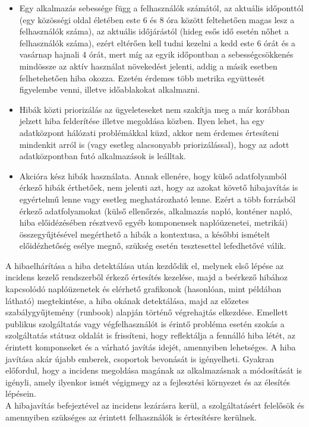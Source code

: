 \begin{itemize}
  \item Egy alkalmazás sebessége függ a felhasználók számától, az aktuális időponttól (egy közösségi oldal életében este 6 és 8 óra között feltehetően magas lesz a felhasználók száma), az aktuális időjárástól (hideg esős idő esetén nőhet a felhasználók száma), ezért eltérően kell tudni kezelni a kedd este 6 órát és a vasárnap hajnali 4 órát, mert míg az egyik időpontban a sebességcsökkenés mindössze az aktív használat növekedést jelenti, addig a másik esetben felhetehetően hiba okozza. Ezetén érdemes több metrika együttesét figyelembe venni, illetve időablakokat alkalmazni.
  \item Hibák közti priorizálás az ügyeleteseket nem szakítja meg a már korábban jelzett hiba felderítése illetve megoldása közben. Ilyen lehet, ha egy adatközpont hálózati problémákkal küzd, akkor nem érdemes értesíteni mindenkit arról is (vagy esetleg alacsonyabb priorizálással), hogy az adott adatközpontban futó alkalmazások is leálltak.
  \item Akcióra kész hibák használata. Annak ellenére, hogy külső adatfolyamból érkező hibák érthetőek, nem jelenti azt, hogy az azokat követő hibajavítás is egyértelmű lenne vagy esetleg meghatározható lenne. Ezért a több forrásból érkező adatfolyamokat (külső ellenőrzés, alkalmazás napló, konténer napló, hiba előidézésében résztvevő egyéb komponensek naplóüzenetei, metrikái) összegyűjtésével megérthető a hibák a kontextusa, a későbbi ismételt előidézhetőség esélye megnő, szükség esetén tesztesettel lefedhetővé válik.
\end{itemize}

A hibaelhárítása a hiba detektálása után kezdődik el, melynek első lépése az incidens kezelő rendszerből érkező értesítés kezelése, majd a beérkező hibához kapcsolódó naplóüzenetek és elérhető grafikonok (hasonlóan, mint  példában látható) megtekintése, a hiba okának detektálása, majd az előzetes szabálygyűjtemény (runbook) alapján történő végrehajtás elkezdése.
Emellett publikus szolgáltatás vagy végfelhasználót is érintő probléma esetén szokás a szolgáltatás státusz oldalát is frissíteni, hogy reflektálja a fennálló hiba létét, az érintett komponseket és a várható javítás idejét, amennyiben lehetséges. A hiba javítása akár újabb emberek, csoportok bevonását is igényelheti. Gyakran előfordul, hogy a incidens megoldása magának az alkalmazásnak a módosítását is igényli, amely ilyenkor ismét végigmegy az a fejlesztési környezet és az élesítés lépésein.\hfill\\
A hibajavítás befejeztével az incidens lezárásra kerül, a szolgáltatásért felelősök és  amennyiben szükséges az érintett felhasználók is értesítésre kerülnek.

